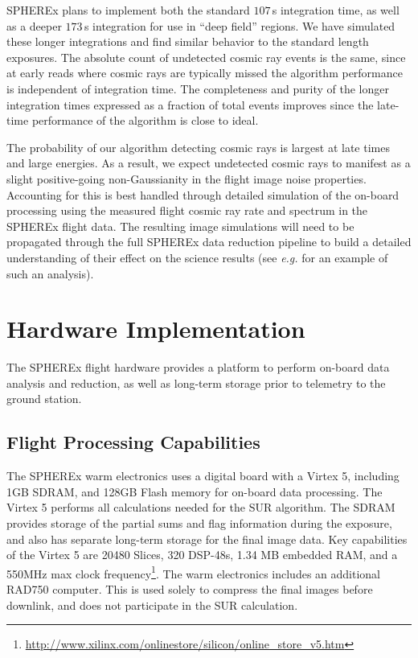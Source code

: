 \documentclass{ws-jai}
\begin{document}
SPHEREx plans to implement both the standard $107 \,$s integration
time, as well as a deeper $173 \,$s integration for use in ``deep
field'' regions.  We have simulated these longer integrations and find
similar behavior to the standard length exposures.  The absolute count
of undetected cosmic ray events is the same, since at early reads
where cosmic rays are typically missed the algorithm performance is
independent of integration time.  The completeness and purity of the
longer integration times expressed as a fraction of total events
improves since the late-time performance of the algorithm is close to
ideal.

The probability of our algorithm detecting cosmic rays is largest at
late times and large energies.  As a result, we expect undetected
cosmic rays to manifest as a slight positive-going non-Gaussianity in
the flight image noise properties.  Accounting for this is best
handled through detailed simulation of the on-board processing using
the measured flight cosmic ray rate and spectrum in the SPHEREx flight
data.  The resulting image simulations will need to be propagated
through the full SPHEREx data reduction pipeline to build a detailed
understanding of their effect on the science results (see
\textit{e.g.} \citealt{Zemcov2014} for an example of such an analysis).

\section{Hardware Implementation}
\label{S:hardware}

The SPHEREx flight hardware provides a platform to perform on-board
data analysis and reduction, as well as long-term storage prior to
telemetry to the ground station.  

\subsection{Flight Processing Capabilities}
\label{sS:flightprocessing}

The SPHEREx warm electronics uses a digital board with a Virtex 5,
including 1GB SDRAM, and 128GB Flash memory for on-board data
processing. The Virtex 5 performs all calculations needed for the SUR
algorithm. The SDRAM provides storage of the partial sums and flag
information during the exposure, and also has separate long-term
storage for the final image data. Key capabilities of the Virtex 5 are
20480 Slices, 320 DSP-48s, 1.34 MB embedded RAM, and a 550MHz max
clock
frequency\footnote{\url{http://www.xilinx.com/onlinestore/silicon/online_store_v5.htm}}.
The warm electronics includes an additional RAD750 computer. This is
used solely to compress the final images before downlink, and does not
participate in the SUR calculation.
 
\end{document}
